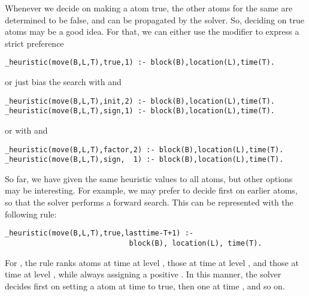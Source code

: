 Whenever we decide on making a  atom true,  
the other  atoms for the same  are determined to be false,
and can be propagated by the solver. 
So, deciding on true  atoms may be a good idea.
For that, we can either use the  modifier to express a strict preference
\begin{lstlisting}[basicstyle=\small\ttfamily,numbers=none]
_heuristic(move(B,L,T),true,1) :- block(B),location(L),time(T).
\end{lstlisting}
or just bias the search with  and 
\begin{lstlisting}[basicstyle=\small\ttfamily,numbers=none]
_heuristic(move(B,L,T),init,2) :- block(B),location(L),time(T).
_heuristic(move(B,L,T),sign,1) :- block(B),location(L),time(T).
\end{lstlisting}
or with  and 
\begin{lstlisting}[basicstyle=\small\ttfamily,numbers=none]
_heuristic(move(B,L,T),factor,2) :- block(B),location(L),time(T).
_heuristic(move(B,L,T),sign,  1) :- block(B),location(L),time(T).
\end{lstlisting}

So far, we have given the same heuristic values to all  atoms,
but other options may be interesting. 
For example, we may prefer to decide first on earlier  atoms,
so that the solver performs a forward search. 
This can be represented with the following rule:
\begin{lstlisting}[basicstyle=\small\ttfamily,numbers=none]
_heuristic(move(B,L,T),true,lasttime-T+1) :- 
                             block(B), location(L), time(T).
\end{lstlisting}
For ,
the rule ranks  atoms at time  at level ,
those at time  at level , and 
those at time  at level ,
while always assigning a positive .  
In this manner, 
the solver decides first on setting a  atom at time  to true, 
then one at time , and so on.

